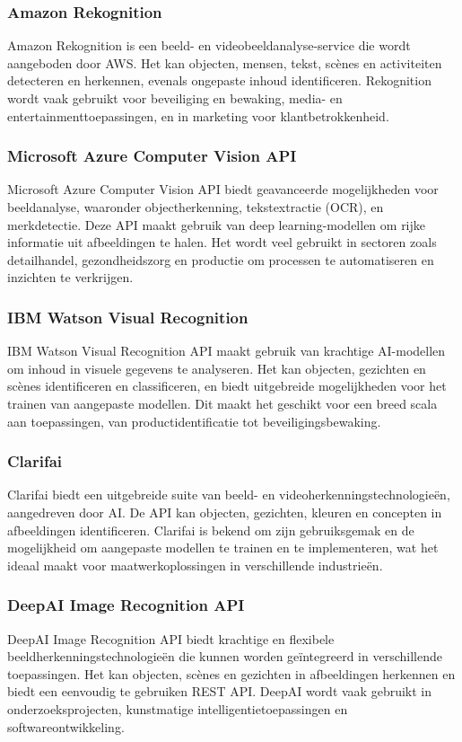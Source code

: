 \subsubsection{Amazon Rekognition}
Amazon Rekognition is een beeld- en videobeeldanalyse-service die wordt aangeboden door AWS. Het kan objecten, mensen, tekst, scènes en activiteiten detecteren en herkennen, evenals ongepaste inhoud identificeren. Rekognition wordt vaak gebruikt voor beveiliging en bewaking, media- en entertainmenttoepassingen, en in marketing voor klantbetrokkenheid\autocite{amazonRekognition}.

\subsubsection{Microsoft Azure Computer Vision API}
Microsoft Azure Computer Vision API biedt geavanceerde mogelijkheden voor beeldanalyse, waaronder objectherkenning, tekstextractie (OCR), en merkdetectie. Deze API maakt gebruik van deep learning-modellen om rijke informatie uit afbeeldingen te halen. Het wordt veel gebruikt in sectoren zoals detailhandel, gezondheidszorg en productie om processen te automatiseren en inzichten te verkrijgen\autocite{microsoftAzureVision}.

\subsubsection{IBM Watson Visual Recognition}
IBM Watson Visual Recognition API maakt gebruik van krachtige AI-modellen om inhoud in visuele gegevens te analyseren. Het kan objecten, gezichten en scènes identificeren en classificeren, en biedt uitgebreide mogelijkheden voor het trainen van aangepaste modellen. Dit maakt het geschikt voor een breed scala aan toepassingen, van productidentificatie tot beveiligingsbewaking\autocite{ibmVisualRecognition}.

\subsubsection{Clarifai}
Clarifai biedt een uitgebreide suite van beeld- en videoherkenningstechnologieën, aangedreven door AI. De API kan objecten, gezichten, kleuren en concepten in afbeeldingen identificeren. Clarifai is bekend om zijn gebruiksgemak en de mogelijkheid om aangepaste modellen te trainen en te implementeren, wat het ideaal maakt voor maatwerkoplossingen in verschillende industrieën\autocite{clarifai}.

\subsubsection{DeepAI Image Recognition API}
DeepAI Image Recognition API biedt krachtige en flexibele beeldherkenningstechnologieën die kunnen worden geïntegreerd in verschillende toepassingen. Het kan objecten, scènes en gezichten in afbeeldingen herkennen en biedt een eenvoudig te gebruiken REST API. DeepAI wordt vaak gebruikt in onderzoeksprojecten, kunstmatige intelligentietoepassingen en softwareontwikkeling\autocite{deepai}.


